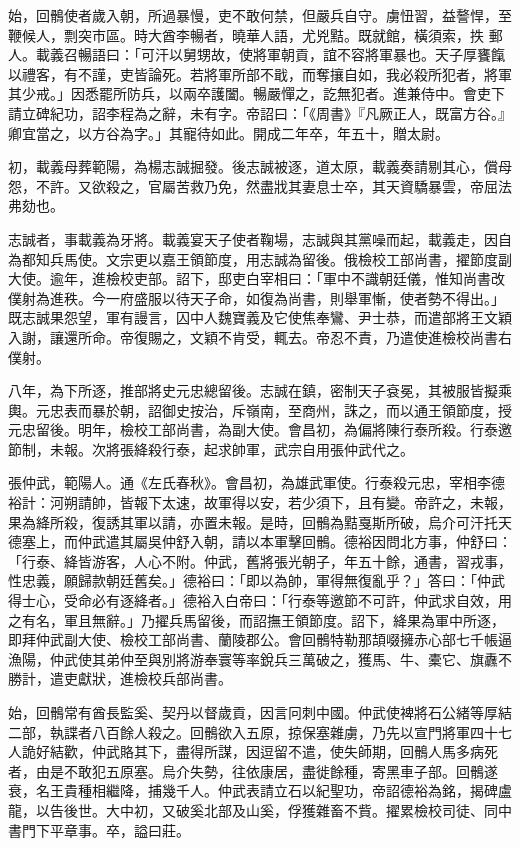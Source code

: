 \begin{pinyinscope}
始，回鶻使者歲入朝，所過暴慢，吏不敢何禁，但嚴兵自守。虜忸習，益謷悍，至鞭候人，剽突市區。時大酋李暢者，曉華人語，尤兇黠。既就館，橫須索，抶
 郵人。載義召暢語曰：「可汗以舅甥故，使將軍朝貢，誼不容將軍暴也。天子厚饔餼以禮客，有不謹，吏皆論死。若將軍所部不戢，而奪攘自如，我必殺所犯者，將軍其少戒。」因悉罷所防兵，以兩卒護闔。暢嚴憚之，訖無犯者。進兼侍中。會吏下請立碑紀功，詔李程為之辭，未有字。帝詔曰：「《周書》『凡厥正人，既富方谷。』卿宜當之，以方谷為字。」其寵待如此。開成二年卒，年五十，贈太尉。



 初，載義母葬範陽，為楊志誠掘發。後志誠被逐，道太原，載義奏請剔其心，償母怨，不許。又欲殺之，官屬苦救乃免，然盡戕其妻息士卒，其天資驕暴雲，帝屈法弗劾也。



 志誠者，事載義為牙將。載義宴天子使者鞠場，志誠與其黨噪而起，載義走，因自為都知兵馬使。文宗更以嘉王領節度，用志誠為留後。俄檢校工部尚書，擢節度副大使。逾年，進檢校吏部。詔下，邸吏白宰相曰：「軍中不識朝廷儀，惟知尚書改僕射為進秩。今一府盛服以待天子命，如復為尚書，則舉軍慚，使者勢不得出。」既志誠果怨望，軍有謾言，囚中人魏寶義及它使焦奉鸞、尹士恭，而遣部將王文穎入謝，讓還所命。帝復賜之，文穎不肯受，輒去。帝忍不責，乃遣使進檢校尚書右僕射。



 八年，為下所逐，推部將史元忠總留後。志誠在鎮，密制天子袞冕，其被服皆擬乘輿。元忠表而暴於朝，詔御史按治，斥嶺南，至商州，誅之，而以通王領節度，授元忠留後。明年，檢校工部尚書，為副大使。會昌初，為偏將陳行泰所殺。行泰邀節制，未報。次將張絳殺行泰，起求帥軍，武宗自用張仲武代之。



 張仲武，範陽人。通《左氏春秋》。會昌初，為雄武軍使。行泰殺元忠，宰相李德裕計：河朔請帥，皆報下太速，故軍得以安，若少須下，且有變。帝許之，未報，果為絳所殺，復誘其軍以請，亦置未報。是時，回鶻為黠戛斯所破，烏介可汗托天德塞上，而仲武遣其屬吳仲舒入朝，請以本軍擊回鶻。德裕因問北方事，仲舒曰：「行泰、絳皆游客，人心不附。仲武，舊將張光朝子，年五十餘，通書，習戎事，性忠義，願歸款朝廷舊矣。」德裕曰：「即以為帥，軍得無復亂乎？」答曰：「仲武得士心，受命必有逐絳者。」德裕入白帝曰：「行泰等邀節不可許，仲武求自效，用之有名，軍且無辭。」乃擢兵馬留後，而詔撫王領節度。詔下，絳果為軍中所逐，即拜仲武副大使、檢校工部尚書、蘭陵郡公。會回鶻特勒那頡啜擁赤心部七千帳逼漁陽，仲武使其弟仲至與別將游奉寰等率銳兵三萬破之，獲馬、牛、橐它、旗纛不勝計，遣吏獻狀，進檢校兵部尚書。



 始，回鶻常有酋長監奚、契丹以督歲貢，因言冋刺中國。仲武使裨將石公緒等厚結二部，執諜者八百餘人殺之。回鶻欲入五原，掠保塞雜虜，乃先以宣門將軍四十七人詭好結歡，仲武賂其下，盡得所謀，因逗留不遣，使失師期，回鶻人馬多病死者，由是不敢犯五原塞。烏介失勢，往依康居，盡徙餘種，寄黑車子部。回鶻遂衰，名王貴種相繼降，捕幾千人。仲武表請立石以紀聖功，帝詔德裕為銘，揭碑盧龍，以告後世。大中初，又破奚北部及山奚，俘獲雜畜不貲。擢累檢校司徒、同中書門下平章事。卒，謚曰莊。




\end{pinyinscope}
